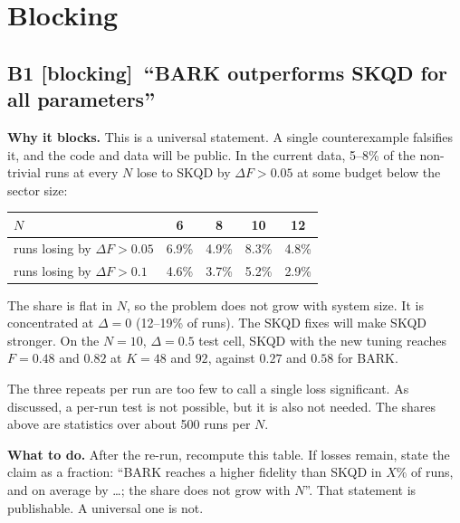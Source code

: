 \documentclass[11pt,a4paper]{article}
\newcommand{\sev}[1]{\textsf{\small[#1]}}
\newcommand{\blocking}{\textcolor{block}{\sev{blocking}}}
\begin{document}
\section{Blocking}

\subsection*{B1 \blocking\ ``BARK outperforms SKQD for all parameters''}
\textbf{Why it blocks.} This is a universal statement. A single counterexample
falsifies it, and the code and data will be public. In the current data, 5--8\% of the
non-trivial runs at every $N$ lose to SKQD by $\Delta F>0.05$ at some budget below the
sector size:
\begin{center}\small
\begin{tabular}{lcccc}\toprule
$N$ & 6 & 8 & 10 & 12\\\midrule
runs losing by $\Delta F>0.05$ & 6.9\% & 4.9\% & 8.3\% & 4.8\%\\
runs losing by $\Delta F>0.1$ & 4.6\% & 3.7\% & 5.2\% & 2.9\%\\\bottomrule
\end{tabular}
\end{center}
The share is flat in $N$, so the problem does not grow with system size. It
is concentrated at $\Delta=0$ (12--19\% of runs). The SKQD fixes will
make SKQD stronger. On the $N=10$, $\Delta=0.5$ test cell, SKQD with the new
tuning reaches $F=0.48$ and $0.82$ at $K=48$ and $92$, against $0.27$ and
$0.58$ for BARK.

The three repeats per run are too few to call a single loss significant. As
discussed, a per-run test is not possible, but it is also not needed. The
shares above are statistics over about 500 runs per $N$.

\textbf{What to do.} After the re-run, recompute this table. If losses remain,
state the claim as a fraction: ``BARK reaches a higher fidelity than SKQD in
$X\%$ of runs, and on average by \dots; the share does not grow with $N$''.
That statement is publishable. A universal one is not.
\end{document}

